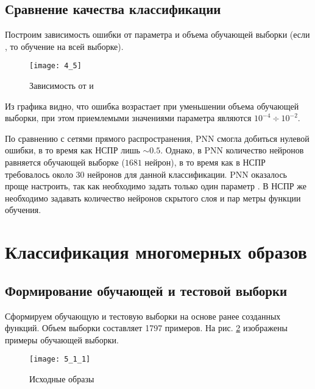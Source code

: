 \vspace{-1cm}
\subsection{Сравнение качества классификации}


Построим зависимость ошибки  от параметра  и объема обучающей выборки  (если , то обучение на всей выборке). 
\vspace{-0.5cm}
\begin{figure}[H]
\begin{center}
	\texttt{[image: 4\_5]}
	\caption{Зависимость  от  и }
	\label{fig:4_5}
\end{center}
\end{figure}
Из графика видно, что ошибка возрастает при уменьшении объема обучающей выборки, при этом приемлемыми значениями параметра  являются $10^{-4} \div 10^{-2}$.

По сравнению с сетями прямого распространения, PNN смогла добиться нулевой ошибки, в то время как НСПР лишь $\sim 0.5$. Однако, в PNN количество нейронов равняется обучающей выборке ($1681$ нейрон), в то время как в НСПР требовалось около $30$ нейронов для данной классификации. PNN оказалось проще настроить, так как необходимо задать только один параметр . В НСПР же необходимо задавать количество нейронов скрытого слоя и пар метры функции обучения.

\newpage

\section{Классификация многомерных образов}

\subsection{Формирование обучающей и тестовой выборки}


Сформируем обучающую и тестовую выборки на основе ранее созданных функций. Объем выборки составляет 1797 примеров. На рис. \ref{fig:5_1_1} изображены примеры обучающей выборки.
\begin{figure}[H]
\begin{center}
	\texttt{[image: 5\_1\_1]}
	\caption{Исходные образы }
	\label{fig:5_1_1}
\end{center}
\end{figure}

